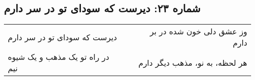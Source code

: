 \begin{center}
\section*{شماره ۲۳: دیرست که سودای تو در سر دارم}
\label{sec:023}
\begin{longtable}{l p{0.5cm} r}
دیرست که سودای تو در سر دارم
&&
وز عشق دلی خون شده در بر دارم
\\
در راه تو یک مذهب و یک شیوه نیم
&&
هر لحظه، به نو، مذهب دیگر دارم
\\
\end{longtable}
\end{center}
